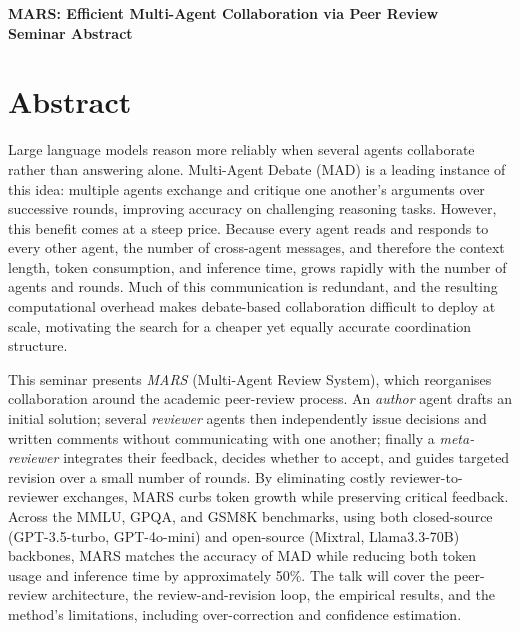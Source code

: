 \documentclass[11pt]{article}
\begin{document}
\begin{center}
{\LARGE\bfseries MARS: Efficient Multi-Agent Collaboration via Peer Review}\\[1.1em]
{\large\bfseries Seminar Abstract}\\[0.6em]
{\normalsize \seminarDate}
\end{center}
\vspace{0.6em}
\section*{Abstract}
Large language models reason more reliably when several agents collaborate rather than answering alone. Multi-Agent Debate (MAD) is a leading instance of this idea: multiple agents exchange and critique one another's arguments over successive rounds, improving accuracy on challenging reasoning tasks. However, this benefit comes at a steep price. Because every agent reads and responds to every other agent, the number of cross-agent messages, and therefore the context length, token consumption, and inference time, grows rapidly with the number of agents and rounds. Much of this communication is redundant, and the resulting computational overhead makes debate-based collaboration difficult to deploy at scale, motivating the search for a cheaper yet equally accurate coordination structure.

This seminar presents \emph{MARS} (Multi-Agent Review System), which reorganises collaboration around the academic peer-review process. An \emph{author} agent drafts an initial solution; several \emph{reviewer} agents then independently issue decisions and written comments without communicating with one another; finally a \emph{meta-reviewer} integrates their feedback, decides whether to accept, and guides targeted revision over a small number of rounds. By eliminating costly reviewer-to-reviewer exchanges, MARS curbs token growth while preserving critical feedback. Across the MMLU, GPQA, and GSM8K benchmarks, using both closed-source (GPT-3.5-turbo, GPT-4o-mini) and open-source (Mixtral, Llama3.3-70B) backbones, MARS matches the accuracy of MAD while reducing both token usage and inference time by approximately 50\%. The talk will cover the peer-review architecture, the review-and-revision loop, the empirical results, and the method's limitations, including over-correction and confidence estimation.
\end{document}

